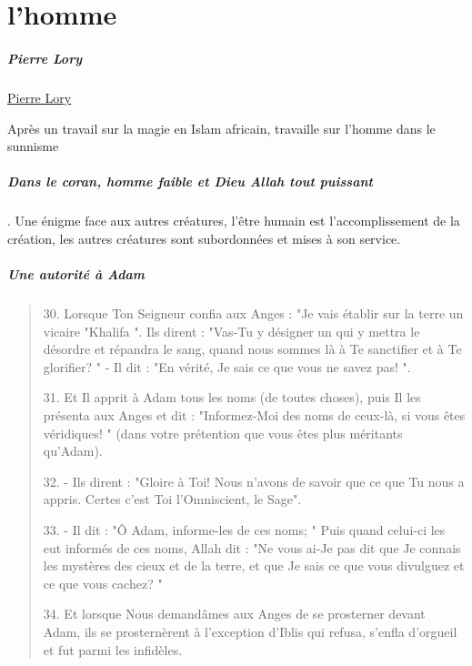 \chapter{l'homme}


\paragraph{Pierre Lory}
\href{https://fr.wikipedia.org/wiki/Pierre_Lory}{Pierre Lory}

Après un travail sur la magie en Islam africain, travaille sur l'homme dans le sunnisme 

\paragraph{Dans le coran, homme faible et Dieu Allah tout puissant}. Une énigme face aux autres créatures, l'être humain est l'accomplissement de la création, les autres créatures sont subordonnées et mises à son service.

\paragraph{Une autorité à Adam}

\begin{quote}
    30. Lorsque Ton Seigneur confia aux Anges : "Je vais établir sur la terre un vicaire "Khalifa ". Ils dirent : "Vas-Tu y désigner un qui y mettra le désordre et répandra le sang, quand nous sommes là à Te sanctifier et à Te glorifier? " - Il dit : "En vérité, Je sais ce que vous ne savez pas! ".

31. Et Il apprit à Adam tous les noms (de toutes choses), puis Il les présenta aux Anges et dit : "Informez-Moi des noms de ceux-là, si vous êtes véridiques! " (dans votre prétention que vous êtes plus méritants qu'Adam).

32. - Ils dirent : "Gloire à Toi! Nous n'avons de savoir que ce que Tu nous a appris. Certes c'est Toi l'Omniscient, le Sage".

33. - Il dit : "Ô Adam, informe-les de ces noms; " Puis quand celui-ci les eut informés de ces noms, Allah dit : "Ne vous ai-Je pas dit que Je connais les mystères des cieux et de la terre, et que Je sais ce que vous divulguez et ce que vous cachez? "

34. Et lorsque Nous demandâmes aux Anges de se prosterner devant Adam, ils se prosternèrent à l'exception d'Iblis qui refusa, s'enfla d'orgueil et fut parmi les infidèles.

\end{quote}

